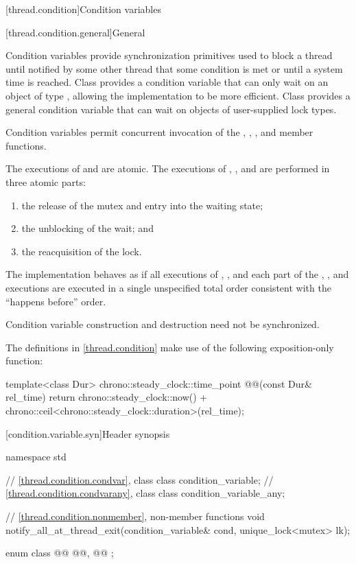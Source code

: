 [thread.condition]{Condition variables}

[thread.condition.general]{General}

\pnum
Condition variables provide synchronization primitives used to block a thread until
notified by some other thread that some condition is met or until a system time is
reached. Class  provides a condition variable that can only
wait on an object of type , allowing the implementation
to be more efficient. Class  provides a general
condition variable that can wait on objects of user-supplied lock types.

\pnum
Condition variables permit concurrent invocation of the , ,
,  and  member functions.

\pnum
The executions of  and 
are atomic.
The executions of , , and  are performed
in three atomic parts:
\begin{enumerate}
\item the release of the mutex and entry into the waiting state;
\item the unblocking of the wait; and
\item the reacquisition of the lock.
\end{enumerate}

\pnum
The implementation behaves as if all executions of , , and each
part of the , , and  executions are
executed in a single unspecified total order consistent with the ``happens before'' order.

\pnum
Condition variable construction and destruction need not be synchronized.

\pnum
The definitions in \ref{thread.condition}
make use of the following exposition-only function:
\begin{codeblock}
template<class Dur>
  chrono::steady_clock::time_point @@(const Dur& rel_time) {
    return chrono::steady_clock::now() + chrono::ceil<chrono::steady_clock::duration>(rel_time);
  }
\end{codeblock}

[condition.variable.syn]{Header  synopsis}

%
\begin{codeblock}
namespace std {
  // \ref{thread.condition.condvar}, class 
  class condition_variable;
  // \ref{thread.condition.condvarany}, class 
  class condition_variable_any;

  // \ref{thread.condition.nonmember}, non-member functions
  void notify_all_at_thread_exit(condition_variable& cond, unique_lock<mutex> lk);

  enum class @@ { @@, @@ };
}
\end{codeblock}

